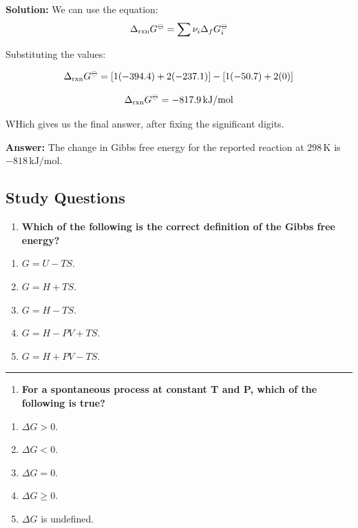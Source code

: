 \documentclass[
  9pt,
]{extbook}
\providecommand{\tightlist}{%
  \setlength{\itemsep}{0pt}\setlength{\parskip}{0pt}}
\theoremstyle{definition}
\theoremstyle{definition}
\theoremstyle{definition}
\theoremstyle{definition}
\theoremstyle{remark}
\begin{document}
\textbf{Solution:} We can use the equation: \[\Delta_{\text{rxn}}G^{{-\kern-6pt{\ominus}\kern-6pt-}} = \sum \nu_i \Delta_f G^{{-\kern-6pt{\ominus}\kern-6pt-}}_i \]

Substituting the values:

\[\Delta_{\text{rxn}}G^{{-\kern-6pt{\ominus}\kern-6pt-}} = [1(-394.4) + 2(-237.1)] - [1(-50.7) + 2(0)]\]

\[\Delta_{\text{rxn}}G^{{-\kern-6pt{\ominus}\kern-6pt-}} = -817.9\,\text{kJ/mol}\]

WHich gives us the final answer, after fixing the significant digits.

\textbf{Answer:} The change in Gibbs free energy for the reported reaction at \(298\,\text{K}\) is \(-818\,\text{kJ/mol}\).

\subsection{Study Questions}\label{quest9}

\begin{enumerate}
\def\labelenumi{\arabic{enumi}.}
\tightlist
\item
  \textbf{Which of the following is the correct definition of the Gibbs free energy?}
\end{enumerate}

\begin{enumerate}
\def\labelenumi{\alph{enumi}.}
\tightlist
\item
  \(G = U - TS\).
\item
  \(G = H + TS\).
\item
  \(G = H - TS\).
\item
  \(G = H - PV + TS\).
\item
  \(G = H + PV - TS\).
\end{enumerate}

\begin{center}\rule{0.5\linewidth}{0.5pt}\end{center}

\begin{enumerate}
\def\labelenumi{\arabic{enumi}.}
\setcounter{enumi}{1}
\tightlist
\item
  \textbf{For a spontaneous process at constant T and P, which of the following is true?}
\end{enumerate}

\begin{enumerate}
\def\labelenumi{\alph{enumi}.}
\tightlist
\item
  \(\Delta G > 0\).
\item
  \(\Delta G < 0\).
\item
  \(\Delta G = 0\).
\item
  \(\Delta G \geq 0\).
\item
  \(\Delta G\) is undefined.
\end{enumerate}
\end{document}
